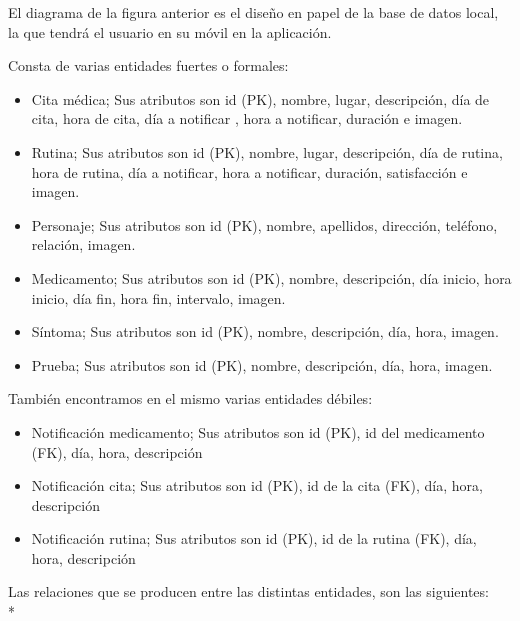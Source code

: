 \documentclass[../pfc.tex]{subfiles}
\begin{document}
		El diagrama de la figura anterior\cite{diagramaer} es el diseño en papel de la base de datos local, la que tendrá el usuario en su móvil en la aplicación.
		
		Consta de varias entidades fuertes o formales:
		
		\begin{itemize}
			\item Cita médica; Sus atributos son id (PK), nombre, lugar, descripción, día de cita, hora de cita, día a notificar , hora a notificar, duración e imagen.
			
			\item Rutina; Sus atributos son id (PK), nombre, lugar, descripción, día de rutina, hora de rutina, día a notificar, hora a notificar, duración, satisfacción e imagen.
			
			\item Personaje; Sus atributos son id (PK), nombre, apellidos, dirección,  teléfono, relación, imagen.
			
			\item Medicamento; Sus atributos son id (PK), nombre, descripción, día inicio, hora inicio, día fin, hora fin, intervalo, imagen.
			
			\item Síntoma; Sus atributos son id (PK), nombre, descripción, día, hora, imagen.
			
			\item Prueba; Sus atributos son id (PK), nombre, descripción, día, hora, imagen.
			
		\end{itemize}
		
		
		
		También encontramos en el mismo varias entidades débiles:
			
		\begin{itemize}
			\item Notificación medicamento; Sus atributos son id (PK), id del medicamento (FK), día, hora, descripción
			
			\item Notificación cita; Sus atributos son id (PK), id de la cita (FK), día, hora, descripción
			
			\item Notificación rutina; Sus atributos son id (PK), id de la rutina (FK), día, hora, descripción
		\end{itemize}
		
		Las relaciones que se producen entre las distintas entidades, son las siguientes:\\*
		
\end{document}
